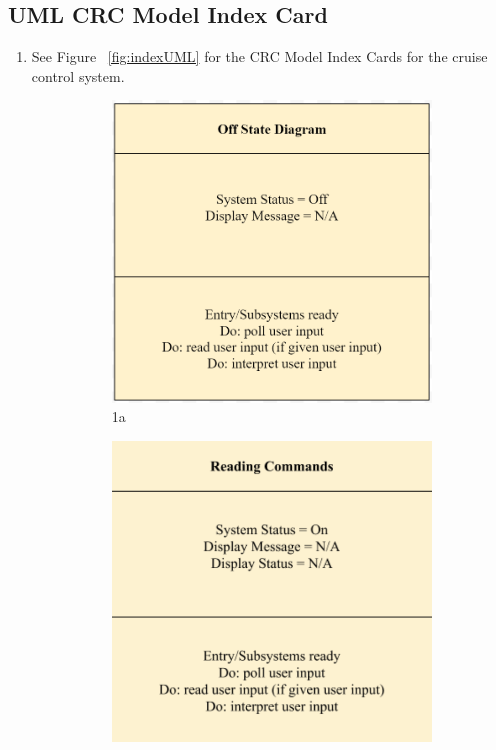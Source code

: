 \documentclass[preprint,11pt,3p]{article}
\begin{document}
\subsection{UML CRC Model Index Card}
\begin{enumerate}
	\item See Figure ~\ref{fig:indexUML} for the CRC Model Index Cards for the cruise control system.
		\begin{figure}[H]
			\begin{subfigure}{.3\textwidth}
				\centering
				\includegraphics[width=.8\linewidth]{images/indexUML1}
				\caption{1a}
				\label{fig:sub1}
			\end{subfigure}
			\begin{subfigure}{.3\textwidth}
				\centering
				\includegraphics[width=.8\linewidth]{images/indexUML2}

\end{subfigure}
\end{figure}
\end{enumerate}
\end{document}
